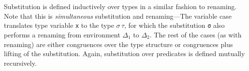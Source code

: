 \documentclass[authoryear, acmsmall, screen, review, nonacm]{acmart}
\begin{document}
\begin{code}%
\>[0]\AgdaSpace{}%
\AgdaSymbol{:}%
\>[10]\AgdaSpace{}%
\AgdaSpace{}%
\AgdaSpace{}%
\AgdaSpace{}%
\AgdaSymbol{(}\AgdaSpace{}%
\AgdaOperator{\AgdaInductiveConstructor{,,}}\AgdaSpace{}%
\AgdaSymbol{)}\AgdaSpace{}%
\AgdaSymbol{(}\AgdaSpace{}%
\AgdaOperator{\AgdaInductiveConstructor{,,}}\AgdaSpace{}%
\AgdaSymbol{)}\<%
\\
\>[0]\AgdaSpace{}%
\AgdaSpace{}%
\AgdaSpace{}%
\AgdaSymbol{=}\AgdaSpace{}%
\AgdaSpace{}%
\<%
\\
\>[0]\AgdaSpace{}%
\AgdaSpace{}%
\AgdaSymbol{(}\AgdaSpace{}%
\AgdaSymbol{)}\AgdaSpace{}%
\AgdaSymbol{=}\AgdaSpace{}%
\AgdaSpace{}%
\AgdaSymbol{(}\AgdaSpace{}%
\AgdaSymbol{)}\<%
\end{code}

Substitution is defined inductively over types in a similar fashion to renaming. Note that this is
\emph{simultaneous} substitution and renaming---The variable case translates type variable \verb!x! to the type $\sigma \, \tau$, for which the substitution \verb!σ! also performs a renaming from environment $\Delta_1$ to $\Delta_2$. The rest of the cases (as with renaming) are either congruences over the type structure or congruences plus lifting of the substitution. Again, substitution over predicates is defined mutually recursively.
\end{document}
